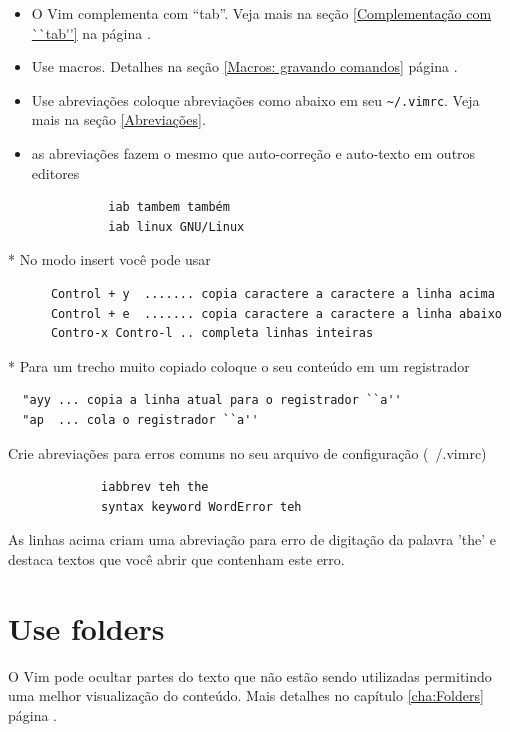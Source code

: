 \documentclass[10pt,a4paper,openany]{book}
\begin{document}
\begin{itemize}
\item O Vim complementa com ``tab''. Veja mais na seção \ref{Complementação com ``tab''} na página \pageref{Complementação com ``tab''}.
\item Use macros. Detalhes na seção \ref{Macros: gravando comandos}
página \pageref{Macros: gravando comandos}.
\item Use abreviações coloque abreviações como abaixo em seu \verb|~/.vimrc|. Veja mais na seção \ref{Abreviações}.
\item as abreviações fazem o mesmo que auto-correção e auto-texto em outros editores
\end{itemize}

\begin{verbatim}
			  iab tambem também
			  iab linux GNU/Linux
\end{verbatim}



* No modo insert você pode usar

\begin{verbatim}
	  Control + y  ....... copia caractere a caractere a linha acima
	  Control + e  ....... copia caractere a caractere a linha abaixo
	  Contro-x Contro-l .. completa linhas inteiras
\end{verbatim}

* Para um trecho muito copiado coloque o seu conteúdo em um registrador

\begin{verbatim}
  "ayy ... copia a linha atual para o registrador ``a''
  "ap  ... cola o registrador ``a''
\end{verbatim}

Crie abreviações para erros comuns no seu arquivo de configuração (~/.vimrc)

\begin{verbatim}
			 iabbrev teh the
			 syntax keyword WordError teh
\end{verbatim}

As linhas acima criam uma abreviação para erro de digitação da palavra 'the'
e destaca textos que você abrir que contenham este erro.

\section{Use folders}\label{sec:Use folders}

O Vim pode ocultar partes do texto que não estão sendo utilizadas permitindo
uma melhor visualização do conteúdo. Mais detalhes no capítulo
\ref{cha:Folders} página \pageref{cha:Folders}.
\end{document}
